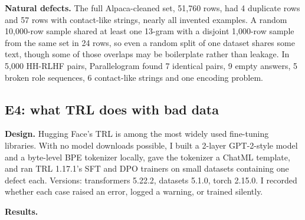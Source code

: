 \textbf{Natural defects.} The full Alpaca-cleaned set, 51,760 rows, had 4 duplicate rows and 57 rows with contact-like strings, nearly all invented examples. A random 10,000-row sample shared at least one 13-gram with a disjoint 1,000-row sample from the same set in 24 rows, so even a random split of one dataset shares some text, though some of those overlaps may be boilerplate rather than leakage. In 5,000 HH-RLHF pairs, Parallelogram found 7 identical pairs, 9 empty answers, 5 broken role sequences, 6 contact-like strings and one encoding problem.

\subsection{E4: what TRL does with bad data}

\textbf{Design.} Hugging Face's TRL is among the most widely used fine-tuning libraries. With no model downloads possible, I built a 2-layer GPT-2-style model and a byte-level BPE tokenizer locally, gave the tokenizer a ChatML template, and ran TRL 1.17.1's SFT and DPO trainers on small datasets containing one defect each. Versions: transformers 5.22.2, datasets 5.1.0, torch 2.15.0. I recorded whether each case raised an error, logged a warning, or trained silently.

\textbf{Results. }

